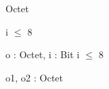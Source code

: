 \begin{algorithme}
{}{Octet}
{}
\end{algorithme}

\begin{algorithme}
{
}
{ i $\leq$ 8}
\end{algorithme}

\begin{algorithme}
{o : Octet, i : \naturelNonNul}{Bit}
{ i $\leq$ 8}
\end{algorithme}

\begin{algorithme}
        {o1, o2 : Octet}
        {\booleen}
        {}
\end{algorithme}